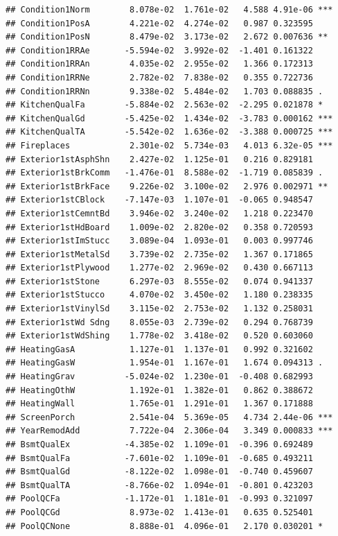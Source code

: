 \documentclass[american,]{article}
\theoremstyle{definition}
\theoremstyle{definition}
\theoremstyle{definition}
\theoremstyle{remark}
\begin{document}
\begin{verbatim}
## Condition1Norm        8.078e-02  1.761e-02   4.588 4.91e-06 ***
## Condition1PosA        4.221e-02  4.274e-02   0.987 0.323595    
## Condition1PosN        8.479e-02  3.173e-02   2.672 0.007636 ** 
## Condition1RRAe       -5.594e-02  3.992e-02  -1.401 0.161322    
## Condition1RRAn        4.035e-02  2.955e-02   1.366 0.172313    
## Condition1RRNe        2.782e-02  7.838e-02   0.355 0.722736    
## Condition1RRNn        9.338e-02  5.484e-02   1.703 0.088835 .  
## KitchenQualFa        -5.884e-02  2.563e-02  -2.295 0.021878 *  
## KitchenQualGd        -5.425e-02  1.434e-02  -3.783 0.000162 ***
## KitchenQualTA        -5.542e-02  1.636e-02  -3.388 0.000725 ***
## Fireplaces            2.301e-02  5.734e-03   4.013 6.32e-05 ***
## Exterior1stAsphShn    2.427e-02  1.125e-01   0.216 0.829181    
## Exterior1stBrkComm   -1.476e-01  8.588e-02  -1.719 0.085839 .  
## Exterior1stBrkFace    9.226e-02  3.100e-02   2.976 0.002971 ** 
## Exterior1stCBlock    -7.147e-03  1.107e-01  -0.065 0.948547    
## Exterior1stCemntBd    3.946e-02  3.240e-02   1.218 0.223470    
## Exterior1stHdBoard    1.009e-02  2.820e-02   0.358 0.720593    
## Exterior1stImStucc    3.089e-04  1.093e-01   0.003 0.997746    
## Exterior1stMetalSd    3.739e-02  2.735e-02   1.367 0.171865    
## Exterior1stPlywood    1.277e-02  2.969e-02   0.430 0.667113    
## Exterior1stStone      6.297e-03  8.555e-02   0.074 0.941337    
## Exterior1stStucco     4.070e-02  3.450e-02   1.180 0.238335    
## Exterior1stVinylSd    3.115e-02  2.753e-02   1.132 0.258031    
## Exterior1stWd Sdng    8.055e-03  2.739e-02   0.294 0.768739    
## Exterior1stWdShing    1.778e-02  3.418e-02   0.520 0.603060    
## HeatingGasA           1.127e-01  1.137e-01   0.992 0.321602    
## HeatingGasW           1.954e-01  1.167e-01   1.674 0.094313 .  
## HeatingGrav          -5.024e-02  1.230e-01  -0.408 0.682993    
## HeatingOthW           1.192e-01  1.382e-01   0.862 0.388672    
## HeatingWall           1.765e-01  1.291e-01   1.367 0.171888    
## ScreenPorch           2.541e-04  5.369e-05   4.734 2.44e-06 ***
## YearRemodAdd          7.722e-04  2.306e-04   3.349 0.000833 ***
## BsmtQualEx           -4.385e-02  1.109e-01  -0.396 0.692489    
## BsmtQualFa           -7.601e-02  1.109e-01  -0.685 0.493211    
## BsmtQualGd           -8.122e-02  1.098e-01  -0.740 0.459607    
## BsmtQualTA           -8.766e-02  1.094e-01  -0.801 0.423203    
## PoolQCFa             -1.172e-01  1.181e-01  -0.993 0.321097    
## PoolQCGd              8.973e-02  1.413e-01   0.635 0.525401    
## PoolQCNone            8.888e-01  4.096e-01   2.170 0.030201 *  

\end{verbatim}
\end{document}
